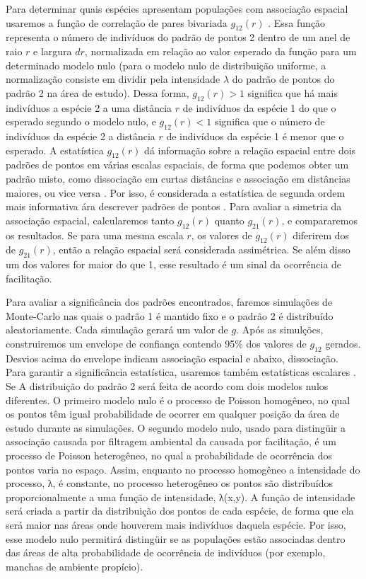 \documentclass[twoside,12pt,a4paper]{report}
\begin{document}
Para determinar quais espécies apresentam populações com associação espacial usaremos a função de correlação
de pares bivariada
$g_{12}(r)$ \citep{Stoyan1994}. Essa função representa o
número de indivíduos do padrão de pontos 2 dentro de um anel de raio $r$ e largura $dr$, 
normalizada em relação ao valor esperado da função para um determinado modelo nulo (para o
modelo nulo de distribuição uniforme, a normalização consiste em dividir pela intensidade
$\lambda$ do padrão de pontos do padrão 2 na área de estudo). Dessa forma, $g_{12}(r) > 1$ significa que há mais indivíduos a
espécie 2 a uma distância $r$ de indivíduos da espécie 1 do que o esperado segundo o modelo
nulo, e $g_{12}(r) < 1 $ significa que o número de indivíduos da espécie 2 a distância $r$ de
indivíduos da espécie 1 é menor
que o esperado. A estatística $g_{12}(r)$ dá informação sobre a relação espacial
entre dois padrões de pontos em várias escalas espaciais, de forma que podemos obter um padrão
misto, como dissociação em curtas distâncias e associação em distâncias maiores, ou vice
versa \citep{WiegandMoloney2004}. Por isso, é considerada a estatística de segunda
ordem mais informativa ára descrever padrões de pontos \citep{IllianBook}.  
Para avaliar a simetria da associação espacial, calcularemos tanto
$g_{12}(r)$ quanto $g_{21}(r)$, e compararemos os resultados. Se para uma mesma escala $r$,
os valores de $g_{12}(r)$ diferirem dos de $g_{21}(r)$, então a relação espacial será
considerada assimétrica. Se além disso um dos valores for maior do que 1, esse resultado é um
sinal da ocorrência de facilitação.

Para avaliar a significância dos padrões encontrados, faremos simulações de Monte-Carlo nas
quais o padrão 1 é mantido fixo e o padrão 2 é distribuído aleatoriamente. 
Cada simulação gerará um valor de $g$. Após as simulções, construiremos um envelope de confiança contendo 95\% dos valores de
$g_{12}$ gerados. Desvios acima do envelope indicam associação espacial e abaixo,
dissociação. Para garantir a significância estatística, usaremos também estatísticas escalares
\citep{DiggleBook}. Se 
A distribuição do
padrão 2 será feita de acordo com dois modelos nulos diferentes. O primeiro modelo nulo é o
processo de Poisson homogêneo, no qual os pontos têm igual probabilidade de ocorrer em
qualquer posição da área de estudo durante as simulações. O segundo modelo nulo, usado para
distingüir a associação causada por filtragem ambiental da causada por facilitação, é um
processo de Poisson heterogêneo, no qual a probabilidade de ocorrência dos pontos varia no
espaço. Assim, enquanto no processo homogêneo a intensidade do processo, λ, é constante, no
processo heterogêneo os pontos são distribuídos proporcionalmente a uma função de
intensidade, λ(x,y). A função de intensidade será criada a partir da distribuição dos pontos
de cada espécie, de forma que ela será maior nas áreas onde houverem mais indivíduos daquela
espécie. Por isso, esse modelo nulo permitirá distingüir se as populações estão associadas
dentro das áreas de alta probabilidade de ocorrência de indivíduos (por exemplo, manchas de
ambiente propício).
\end{document}
